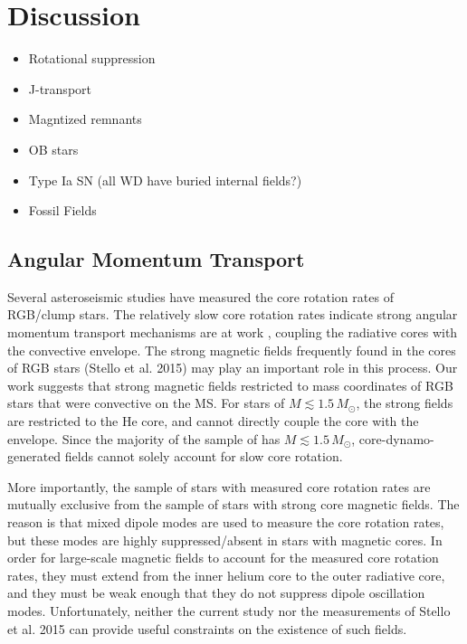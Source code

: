 \section{Discussion}
\begin{itemize}
\item Rotational suppression
\item J-transport
\item Magntized remnants
\item OB stars
\item Type Ia SN (all WD have buried internal fields?)
\item Fossil Fields
\end{itemize}


\subsection{Angular Momentum Transport}

Several asteroseismic studies \citep{Beck_2012,Mosser_2012,Deheuvels_2014,Deheuvels_2015} have measured the core rotation rates of RGB/clump stars. The relatively slow core rotation rates indicate strong angular momentum transport mechanisms are at work \citep{Cantiello_2014}, coupling the radiative cores with the convective envelope. The strong magnetic fields frequently found in the cores of RGB stars (Stello et al. 2015) may play an important role in this process. Our work suggests that strong magnetic fields restricted to mass coordinates of RGB stars that were convective on the MS. For stars of $M \lesssim 1.5 \, M_\odot$, the strong fields are restricted to the He core, and cannot directly couple the core with the envelope. Since the majority of the sample of \cite{Mosser_2012} has $M \lesssim 1.5 \, M_\odot$, core-dynamo-generated fields cannot solely account for slow core rotation.

More importantly, the sample of stars with measured core rotation rates are mutually exclusive from the sample of stars with strong core magnetic fields. The reason is that mixed dipole modes are used to measure the core rotation rates, but these modes are highly suppressed/absent in stars with magnetic cores. In order for large-scale magnetic fields to account for the measured core rotation rates, they must extend from the inner helium core to the outer radiative core, and they must be weak enough that they do not suppress dipole oscillation modes. Unfortunately, neither the current study nor the measurements of Stello et al. 2015 can provide useful constraints on the existence of such fields. 


